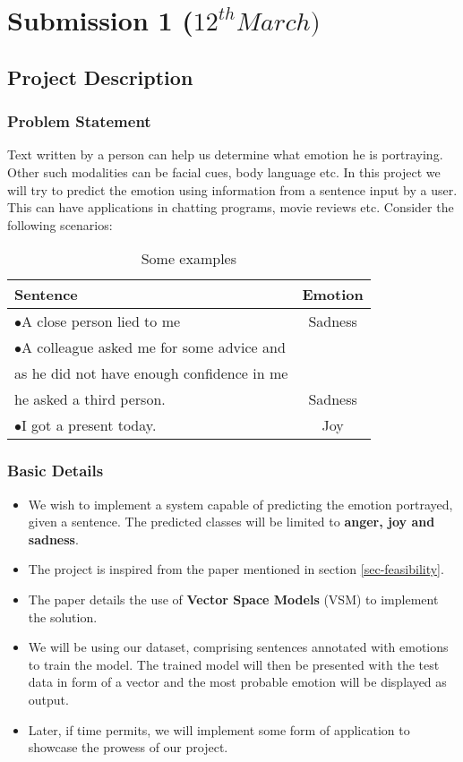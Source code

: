 \chapter{Submission 1 ($12^{th} March)$}
\section{Project Description}
\subsection{Problem Statement}
Text written by a person can help us determine what emotion he is portraying. Other such modalities can be facial cues, body language etc. In this project we will try to predict the emotion using information from a sentence input by a user. This can have applications in chatting programs, movie reviews etc. Consider the following scenarios:

\begin{table}[ht!]
\centering
\label{tab-some-examples}
\begin{tabular}{l|c}
\textbf{Sentence} & \textbf{Emotion} \\
\hline
$\bullet$A close person lied to me & Sadness \\
$\bullet$A colleague asked me for some advice and & \\
as he did not have enough confidence in me & \\
he asked a third person. & Sadness \\
$\bullet$I got a present today. & Joy
\end{tabular}
\caption{Some examples}
\end{table}

\subsection{Basic Details}
\label{subsec-basic-details}
\begin{itemize}
\item We wish to implement a system capable of predicting the emotion portrayed, given a sentence. The predicted classes will be limited to \textbf{anger, joy and sadness}.
\item The project is inspired from the paper mentioned in section \ref{sec-feasibility}.
\item The paper details the use of \textbf{Vector Space Models} (VSM) to implement the solution.
\item We will be using our dataset, comprising sentences annotated with emotions to train the model. The trained model will then be presented with the test data in form of a vector and the most probable emotion will be displayed as output.
\item Later, if time permits, we will implement some form of application to showcase the prowess of our project.
\end{itemize}
